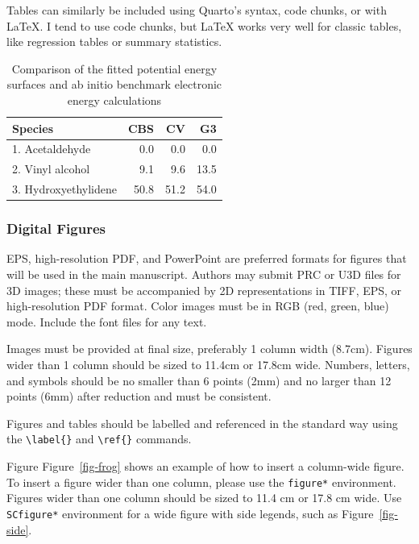 \documentclass[
  9pt,
  twocolumn,
  twoside]{pnas-new}
\begin{document}
Tables can similarly be included using Quarto's syntax, code chunks, or
with LaTeX. I tend to use code chunks, but LaTeX works very well for
classic tables, like regression tables or summary statistics.

\begin{table}[t!]
\centering
\caption{Comparison of the fitted potential energy surfaces and ab initio benchmark electronic energy calculations}
\begin{tabular}{lrrr}
Species & CBS & CV & G3 \\
\midrule
1. Acetaldehyde & 0.0 & 0.0 & 0.0 \\
2. Vinyl alcohol & 9.1 & 9.6 & 13.5 \\
3. Hydroxyethylidene & 50.8 & 51.2 & 54.0\\
\bottomrule
\end{tabular}

\end{table}

\subsubsection*{Digital Figures}\label{digital-figures}

EPS, high-resolution PDF, and PowerPoint are preferred formats for
figures that will be used in the main manuscript. Authors may submit PRC
or U3D files for 3D images; these must be accompanied by 2D
representations in TIFF, EPS, or high-resolution PDF format. Color
images must be in RGB (red, green, blue) mode. Include the font files
for any text.

Images must be provided at final size, preferably 1 column width
(8.7cm). Figures wider than 1 column should be sized to 11.4cm or 17.8cm
wide. Numbers, letters, and symbols should be no smaller than 6 points
(2mm) and no larger than 12 points (6mm) after reduction and must be
consistent.

Figures and tables should be labelled and referenced in the standard way
using the \texttt{\textbackslash{}label\{\}} and
\texttt{\textbackslash{}ref\{\}} commands.

Figure Figure~\ref{fig-frog} shows an example of how to insert a
column-wide figure. To insert a figure wider than one column, please use
the \texttt{figure*} environment. Figures wider than one column should
be sized to 11.4 cm or 17.8 cm wide. Use \texttt{SCfigure*} environment
for a wide figure with side legends, such as Figure~\ref{fig-side}.
\end{document}
